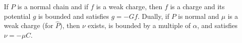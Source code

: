 If $P$ is a normal chain and if $f$ is a weak charge, then $f$ is a charge and its potential $g$ is bounded and satisfies $g = -Gf$. Dually, if $P$ is normal and $\mu$ is a weak charge (for $\hat{P}$), then $\nu$ exists, is bounded by a multiple of $\alpha$, and satisfies $\nu = -\mu C$.
